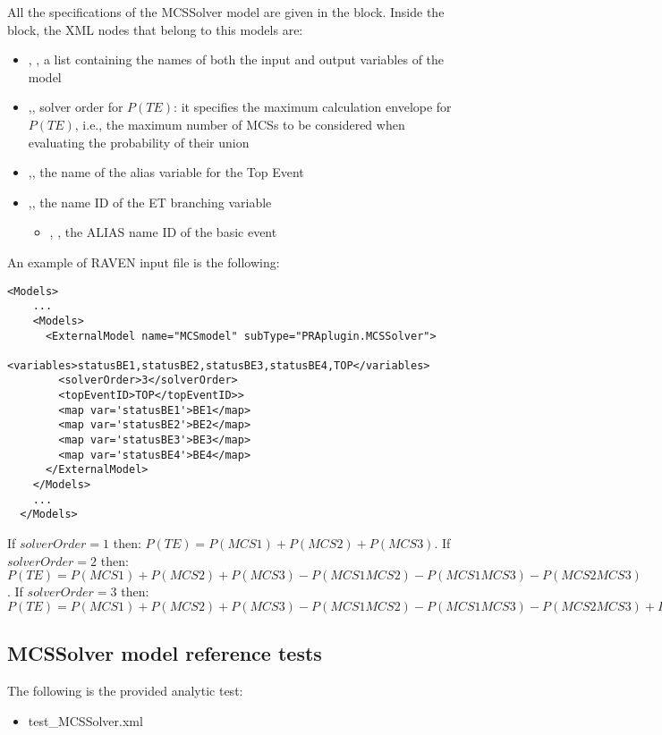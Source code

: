 All the specifications of the MCSSolver model are given in the  block. 
Inside the  block, the XML nodes that belong to this models are:
\begin{itemize}
  \item  {}, , a list containing the names of both the input and output variables of the model
  \item  {},, solver order for $P(TE)$: it specifies the maximum calculation envelope 
                                                                      for $P(TE)$, i.e., the maximum number of MCSs to be considered when evaluating the 
                                                                      probability of their union
  \item  {},, the name of the alias variable for the Top Event
  \item  {},, the name ID of the ET branching variable
	  \begin{itemize}
	    \item {}, , the ALIAS name ID of the basic event
	  \end{itemize}
\end{itemize}

An example of RAVEN input file is the following:

\begin{lstlisting}[style=XML,morekeywords={anAttribute},caption=MCSSolver model input example., label=lst:MCSSolver_InputExample]
  <Models> 
    ...
    <Models>
      <ExternalModel name="MCSmodel" subType="PRAplugin.MCSSolver">
        <variables>statusBE1,statusBE2,statusBE3,statusBE4,TOP</variables>
        <solverOrder>3</solverOrder>
        <topEventID>TOP</topEventID>>
        <map var='statusBE1'>BE1</map>
        <map var='statusBE2'>BE2</map>
        <map var='statusBE3'>BE3</map>
        <map var='statusBE4'>BE4</map>
      </ExternalModel>
    </Models>
    ...
  </Models>
\end{lstlisting}

If $solverOrder=1$ then: $P(TE) = P(MCS1)+P(MCS2)+P(MCS3)$.  
If $solverOrder=2$ then: $P(TE) = P(MCS1)+P(MCS2)+P(MCS3) - P(MCS1 MCS2) - P(MCS1 MCS3) - P(MCS2 MCS3)$.  
If $solverOrder=3$ then: $P(TE) = P(MCS1)+P(MCS2)+P(MCS3) - P(MCS1 MCS2) - P(MCS1 MCS3) - P(MCS2 MCS3) + P(MCS1 MCS2 MCS3)$

\subsection{MCSSolver model reference tests}
The following is the provided analytic test:
\begin{itemize}
	\item test\_MCSSolver.xml
\end{itemize}



